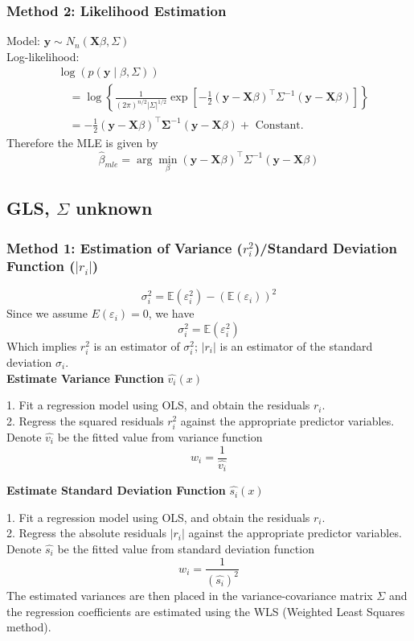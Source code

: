 \documentclass[11pt,a4paper]{article}
\begin{document}
\subsubsection{Method 2: Likelihood Estimation}
Model: $\mathbf{y} \sim N_{n}(\mathbf{X} \beta, \Sigma)$\\
Log-likelihood:
$$
\begin{aligned}
&\log (p(\mathbf{y} \mid \beta, \Sigma)) \\
&\quad=\log \left\{\frac{1}{(2 \pi)^{n / 2}|\Sigma|^{1 / 2}} \exp \left[-\frac{1}{2}(\mathbf{y}-\mathbf{X} \beta)^{\top} \Sigma^{-1}(\mathbf{y}-\mathbf{X} \beta)\right]\right\} \\
&\quad=-\frac{1}{2}(\mathbf{y}-\mathbf{X} \beta)^{\top} \boldsymbol{\Sigma}^{-1}(\mathbf{y}-\mathbf{X} \beta)+\text { Constant. }
\end{aligned}
$$
Therefore the MLE is given by
$$
\hat{\beta}_{m l e}=\arg \min _{\beta}(\mathbf{y}-\mathbf{X} \beta)^{\top} \Sigma^{-1}(\mathbf{y}-\mathbf{X} \beta)
$$

\subsection{GLS, $\Sigma$ unknown}
\subsubsection{Method 1: Estimation of Variance ($r_i^2$)/Standard Deviation Function ($|r_i|$)}
$$\sigma_i^2=\mathbb{E}(\varepsilon_i^2)-(\mathbb{E}(\varepsilon_i))^2$$
Since we assume $E(\varepsilon_i)=0$, we have
$$\sigma_i^2=\mathbb{E}(\varepsilon_i^2)$$
Which implies $r_i^2$ is an estimator of $\sigma_i^2$; $|r_i|$ is an estimator of the standard deviation $\sigma_i$.\\

\textbf{Estimate Variance Function} $\hat{v_i}(x)$

1. Fit a regression model using OLS, and obtain the residuals $r_i$.\\
2. Regress the squared residuals $r_i^2$ against the appropriate predictor variables.\\
Denote $\hat{v_i}$ be the ﬁtted value from variance function
$$w_i=\frac{1}{\hat{v_i}}$$

\textbf{Estimate Standard Deviation Function} $\hat{s_i}(x)$

1. Fit a regression model using OLS, and obtain the residuals $r_i$.\\
2. Regress the absolute residuals $|r_i|$ against the appropriate predictor variables.\\
Denote $\hat{s_i}$ be the ﬁtted value from standard deviation function
$$w_i=\frac{1}{(\hat{s_i})^2}$$
The estimated variances are then placed in the variance-covariance matrix $\Sigma$ and the regression coeﬃcients are estimated using the WLS (Weighted Least Squares method).
\end{document}
